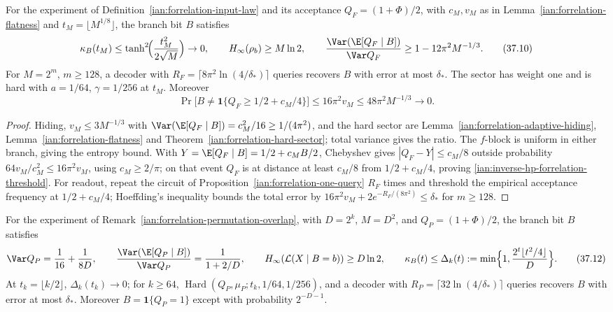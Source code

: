 \begin{proposition}
\label{ian:inverse-hp-forrelation-branch}
For the experiment of Definition~\ref{ian:forrelation-input-law} and its acceptance \(Q_F=(1+\Phi)/2\), with \(c_M,v_M\) as in Lemma~\ref{ian:forrelation-flatness} and \(t_M=\lfloor M^{1/8}\rfloor\), the branch bit \(B\) satisfies
\[
 \kappa_B(t_M)\le\tanh^2\!\Bigl(\frac{t_M^2}{2\sqrt M}\Bigr)\to0,\qquad
 H_\infty(\rho_b)\ge M\ln2,\qquad
 \frac{\Var(\E[Q_F\mid B])}{\Var Q_F}\ge1-12\pi^2M^{-1/3}.
 \tag{37.10}
\]
For \(M=2^m\), \(m\ge128\), a decoder with \(R_F=\lceil8\pi^2\ln(4/\delta_*)\rceil\) queries recovers \(B\) with error at most \(\delta_*\). The sector has weight one and is hard with \(a=1/64\), \(\gamma=1/256\) at \(t_M\). Moreover
\[
 \Pr\bigl[B\ne\mathbf1\{Q_F\ge1/2+c_M/4\}\bigr]\le16\pi^2v_M\le48\pi^2M^{-1/3}\to0.
 \tag{37.11}\label{ian:inverse-hp-forrelation-threshold}
\]
\end{proposition}

\begin{proof}
Hiding, \(v_M\le3M^{-1/3}\) with \(\Var(\E[Q_F\mid B])=c_M^2/16\ge1/(4\pi^2)\), and the hard sector are Lemma~\ref{ian:forrelation-adaptive-hiding}, Lemma~\ref{ian:forrelation-flatness} and Theorem~\ref{ian:forrelation-hard-sector}; total variance gives the ratio. The \(f\)-block is uniform in either branch, giving the entropy bound. With \(Y=\E[Q_F\mid B]=1/2+c_MB/2\), Chebyshev gives \(|Q_F-Y|\le c_M/8\) outside probability \(64v_M/c_M^2\le16\pi^2v_M\), using \(c_M\ge2/\pi\); on that event \(Q_F\) is at distance at least \(c_M/8\) from \(1/2+c_M/4\), proving \eqref{ian:inverse-hp-forrelation-threshold}. For readout, repeat the circuit of Proposition~\ref{ian:forrelation-one-query} \(R_F\) times and threshold the empirical acceptance frequency at \(1/2+c_M/4\); Hoeffding's inequality bounds the total error by \(16\pi^2v_M+2e^{-R_F/(8\pi^2)}\le\delta_*\) for \(m\ge128\).
\end{proof}

\begin{proposition}
\label{ian:inverse-hp-mm-branch}
For the experiment of Remark~\ref{ian:forrelation-permutation-overlap}, with \(D=2^k\), \(M=D^2\), and \(Q_P=(1+\Phi)/2\), the branch bit \(B\) satisfies
\[
 \Var Q_P=\frac1{16}+\frac1{8D},\qquad
 \frac{\Var(\E[Q_P\mid B])}{\Var Q_P}=\frac1{1+2/D},\qquad
 H_\infty(\mathcal L(X\mid B=b))\ge D\ln2,\qquad
 \kappa_B(t)\le\Delta_k(t):=\min\Bigl\{1,\frac{2^t\lfloor t^2/4\rfloor}{D}\Bigr\}.
 \tag{37.12}
\]
At \(t_k=\lfloor k/2\rfloor\), \(\Delta_k(t_k)\to0\); for \(k\ge64\), \(\operatorname{Hard}(Q_P,\mu_P;t_k,1/64,1/256)\), and a decoder with \(R_P=\lceil32\ln(4/\delta_*)\rceil\) queries recovers \(B\) with error at most \(\delta_*\). Moreover \(B=\mathbf1\{Q_P=1\}\) except with probability \(2^{-D-1}\).
\end{proposition}

